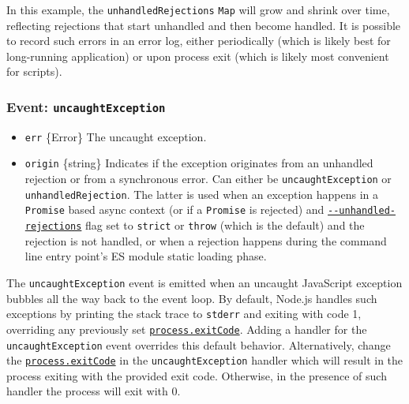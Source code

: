 In this example, the \texttt{unhandledRejections} \texttt{Map} will grow
and shrink over time, reflecting rejections that start unhandled and
then become handled. It is possible to record such errors in an error
log, either periodically (which is likely best for long-running
application) or upon process exit (which is likely most convenient for
scripts).

\subsubsection{\texorpdfstring{Event:
\texttt{\textquotesingle{}uncaughtException\textquotesingle{}}}{Event: \textquotesingle uncaughtException\textquotesingle{}}}\label{event-uncaughtexception}

\begin{itemize}
\tightlist
\item
  \texttt{err} \{Error\} The uncaught exception.
\item
  \texttt{origin} \{string\} Indicates if the exception originates from
  an unhandled rejection or from a synchronous error. Can either be
  \texttt{\textquotesingle{}uncaughtException\textquotesingle{}} or
  \texttt{\textquotesingle{}unhandledRejection\textquotesingle{}}. The
  latter is used when an exception happens in a \texttt{Promise} based
  async context (or if a \texttt{Promise} is rejected) and
  \href{cli.md\#--unhandled-rejectionsmode}{\texttt{-\/-unhandled-rejections}}
  flag set to \texttt{strict} or \texttt{throw} (which is the default)
  and the rejection is not handled, or when a rejection happens during
  the command line entry point's ES module static loading phase.
\end{itemize}

The \texttt{\textquotesingle{}uncaughtException\textquotesingle{}} event
is emitted when an uncaught JavaScript exception bubbles all the way
back to the event loop. By default, Node.js handles such exceptions by
printing the stack trace to \texttt{stderr} and exiting with code 1,
overriding any previously set
\hyperref[processexitcode_1]{\texttt{process.exitCode}}. Adding a
handler for the
\texttt{\textquotesingle{}uncaughtException\textquotesingle{}} event
overrides this default behavior. Alternatively, change the
\hyperref[processexitcode_1]{\texttt{process.exitCode}} in the
\texttt{\textquotesingle{}uncaughtException\textquotesingle{}} handler
which will result in the process exiting with the provided exit code.
Otherwise, in the presence of such handler the process will exit with 0.

